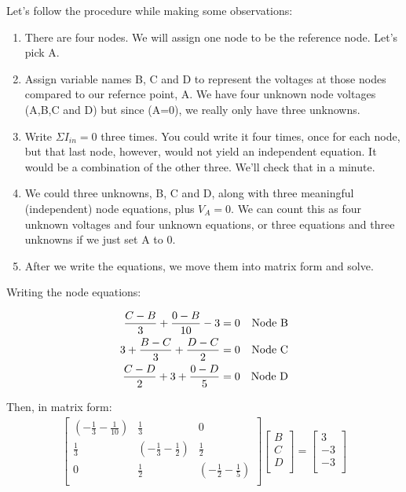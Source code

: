 Let's follow the procedure while making some observations:
\begin{enumerate}
\item There are four nodes. We will assign one node to be the reference node. Let's pick A.
\item Assign variable names B, C and D to represent the voltages at those nodes compared to our refernce point, A. We have four unknown node voltages (A,B,C and D) but since (A=0), we really only have three unknowns.
\item Write $\Sigma I_{in}=0$ three times. You could write it four times, once for each node, but that last node, however, would not yield an independent equation. It would be a combination of the other three. We'll check that in a minute.
\item We could three unknowns, B, C and D, along with three meaningful (independent) node equations, plus $V_A=0$. We can count this as four unknown voltages and four unknown equations, or three equations and three unknowns if we just set A to 0.
\item After we write the equations, we move them into matrix form and solve.
\end{enumerate}

Writing the node equations:
\par
\begin{align}
\frac{C-B}{3}+\frac{0-B}{10}-3=0 &&\text{Node B}\notag\\
3 + \frac{B-C}{3}+\frac{D-C}{2}=0 &&\text{Node C}\notag\\
\frac{C-D}{2}+3+\frac{0-D}{5}=0 &&\text{Node D}
\end{align} 

Then, in matrix form:
\begin{align}
\left[ \begin{matrix}
(-\frac{1}{3}-\frac{1}{10})&	\frac{1}{3}&	0\\
\frac{1}{3}&	(-\frac{1}{3}-\frac{1}{2})&\frac{1}{2}\\
0	&	\frac{1}{2}&	(-\frac{1}{2}-\frac{1}{5})\\
\end{matrix} \right]
\left[ \begin{matrix}
B\\
C\\
D\\
\end{matrix} \right] =
\left[ \begin{matrix}
3\\
-3\\
-3\\
\end{matrix} \right]
\end{align}

